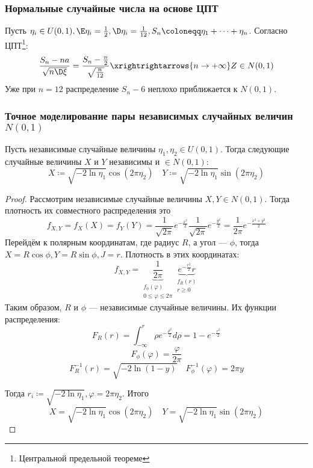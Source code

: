 \subsubsection{Нормальные случайные числа на основе ЦПТ}

Пусть \(\eta_i \in U(0, 1), \E \eta_i = \frac{1}{2}, \D \eta_i = \frac{1}{12}, S_n \coloneqq \eta_1 + \dots + \eta_n\). Согласно ЦПТ\footnote{Центральной предельной теореме}:
\[\frac{S_n - na}{\sqrt{n \D \xi}} = \frac{S_n - \frac{n}{2}}{\sqrt{\frac{n}{12}}} \xrightrightarrows{n \to +\infty} Z \in N(0, 1)\]
Уже при \(n = 12\) распределение \(S_n - 6\) неплохо приближается к \(N(0, 1)\).

\subsubsection{Точное моделирование пары независимых случайных величин \(N(0, 1)\)}

\begin{theorem}
    Пусть независимые случайные величины \(\eta_1, \eta_2 \in U(0, 1)\). Тогда следующие случайные величины \(X\) и \(Y\) независимы и \(\in N(0, 1)\):
    \[X \coloneqq \sqrt{ - 2 \ln \eta_1} \cos(2\pi \eta_2) \quad Y \coloneqq \sqrt{ - 2 \ln \eta_1} \sin(2\pi \eta_2)\]
\end{theorem}
\begin{proof}
    Рассмотрим независимые случайные величины \(X, Y \in N(0, 1)\). Тогда плотность их совместного распределения это
    \[f_{X, Y} = f_X(X) = f_Y(Y) = \frac{1}{\sqrt{2 \pi}} e^{ -\frac{x^2}{2}} \frac{1}{\sqrt{2 \pi}} e^{ -\frac{y^2}{2}} = \frac{1}{2\pi} e^{ - \frac{x^2 + y^2}{2}}\]
    Перейдём к полярным координатам, где радиус \(R\), а угол --- \(\phi\), тогда \(X = R\cos \phi, Y = R\sin \phi, J = r\). Плотность в этих координатах:
    \[f_{X, Y} = \underbrace{\frac{1}{2\pi}}_{\substack{f_\phi(\varphi) \\ 0 \leq \varphi \leq 2\pi}} \underbrace{e^{ - \frac{r^2}{2}} r}_{\substack{f_R(r) \\ r \geq 0}}\]
    Таким образом, \(R\) и \(\phi\) --- независимые случайные величины. Их функции распределения:
    \[F_R(r) = \int_{-\infty}^r \rho e^{ - \frac{\rho^2}{2}} d\rho = 1 - e^{ - \frac{r^2}{2}}\]
    \[F_\phi(\varphi) = \frac{\varphi}{2\pi}\]
    \[F_R^{-1}(r) = \sqrt{ - 2\ln (1 - y)} \quad F_\phi^{-1}(\varphi) = 2\pi y\]

    Тогда \(r_i \coloneqq \sqrt{ - 2\ln \eta_1}, \varphi = 2\pi \eta_2\). Итого
    \[X = \sqrt{ - 2 \ln \eta_1} \cos(2\pi \eta_2) \quad Y = \sqrt{ - 2 \ln \eta_1} \sin(2\pi \eta_2)\]
\end{proof}


